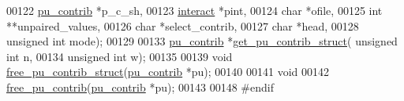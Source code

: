 \begin{DoxyCode}
00122             \mbox{\hyperlink{group__data__structures_structpu__contrib}{pu\_contrib}} *p\_c\_sh,
00123             \mbox{\hyperlink{group__data__structures_structinteract}{interact}} *pint,
00124             \textcolor{keywordtype}{char} *ofile,
00125             \textcolor{keywordtype}{int} **unpaired\_values,
00126             \textcolor{keywordtype}{char} *select\_contrib,
00127             \textcolor{keywordtype}{char} *head,
00128             \textcolor{keywordtype}{unsigned} \textcolor{keywordtype}{int} mode);
00129 
00133 \mbox{\hyperlink{group__data__structures_structpu__contrib}{pu\_contrib}}  *\mbox{\hyperlink{group__up__cofold_gadb5cde7e5ef562664db38638171c7a66}{get\_pu\_contrib\_struct}}( \textcolor{keywordtype}{unsigned} \textcolor{keywordtype}{int} n,
00134                                     \textcolor{keywordtype}{unsigned} \textcolor{keywordtype}{int} w);
00135 
00139 \textcolor{keywordtype}{void}        \mbox{\hyperlink{group__up__cofold_gac20bd61824981d45ce0dc9934aa56df8}{free\_pu\_contrib\_struct}}(\mbox{\hyperlink{group__data__structures_structpu__contrib}{pu\_contrib}} *pu);
00140 
00141 \textcolor{keywordtype}{void}
00142 \mbox{\hyperlink{group__up__cofold_gae1b3579727cf7a27eea93594d0e6d831}{free\_pu\_contrib}}(\mbox{\hyperlink{group__data__structures_structpu__contrib}{pu\_contrib}} *pu);
00143 
00148 \textcolor{preprocessor}{#endif}
\end{DoxyCode}
